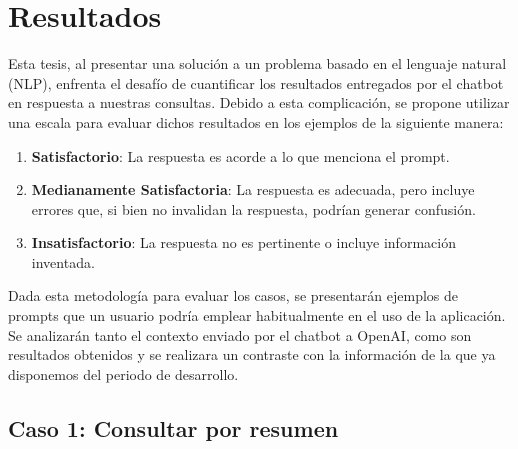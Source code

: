 \chapter{Resultados}

Esta tesis, al presentar una solución a un problema basado en el lenguaje natural (NLP), enfrenta el desafío de cuantificar 
los resultados entregados por el chatbot en respuesta a nuestras consultas. Debido a esta complicación, se propone utilizar 
una escala para evaluar dichos resultados en los ejemplos de la siguiente manera:

\begin{enumerate}
    \item \textbf{Satisfactorio}: La respuesta es acorde a lo que menciona el prompt.
    \item \textbf{Medianamente Satisfactoria}: La respuesta es adecuada, pero incluye errores que, si bien no invalidan la respuesta, podrían generar confusión.
    \item \textbf{Insatisfactorio}: La respuesta no es pertinente o incluye información inventada.
\end{enumerate}

Dada esta metodología para evaluar los casos, se presentarán ejemplos de prompts que un usuario podría emplear habitualmente 
en el uso de la aplicación. Se analizarán tanto el contexto enviado por el chatbot a OpenAI, como son resultados obtenidos y se 
realizara un contraste con la información de la que ya disponemos del periodo de desarrollo.

\section{Caso 1: Consultar por resumen}


